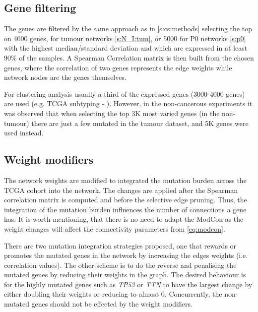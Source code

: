 \subsection{Gene filtering} \label{s:N_I:gene_filtering}

The genes are filtered by the same approach as in \cref{s:cs:methods} selecting the top on 4000 genes, for tumour networks \cref{s:N_I:tum}, or 5000 for P0 networks \cref{s:p0} with the highest median/standard deviation and which are expressed in at least 90\% of the samples. A Spearman Correlation matrix is then built from the chosen genes, where the correlation of two genes represents the edge weights while network nodes are the genes themselves. 

For clustering analysis usually a third of the expressed genes (3000-4000 genes) are used (e.g. TCGA subtyping - \citet{Robertson2017-mg}). However, in the non-cancerous experiments it was observed that when selecting the top 3K most varied genes (in the non-tumour) there are just a few mutated in the tumour dataset, and 5K genes were used instead.


\subsection{Weight modifiers} \label{s:N_I:weight_modifiers}

The network weights are modified to integrated the mutation burden across the TCGA cohort into the network. The changes are applied after the Spearman correlation matrix is computed and before the selective edge pruning. Thus, the integration of the mutation burden influences the number of connections a gene has. It is worth mentioning, that there is no need to adapt the ModCon as the weight changes will affect the connectivity parameters from  \cref{eq:modcon}.

There are two mutation integration strategies proposed, one that rewards or promotes the mutated genes in the network by increasing the edges weights (i.e. correlation values). The other scheme is to do the reverse and penalising the mutated genes by reducing their weights in the graph. The desired behaviour is for the highly mutated genes such as \textit{TP53} or \textit{TTN} to have the largest change by either doubling their weights or reducing to almost 0. Concurrently, the non-mutated genes should not be effected by the weight modifiers.


